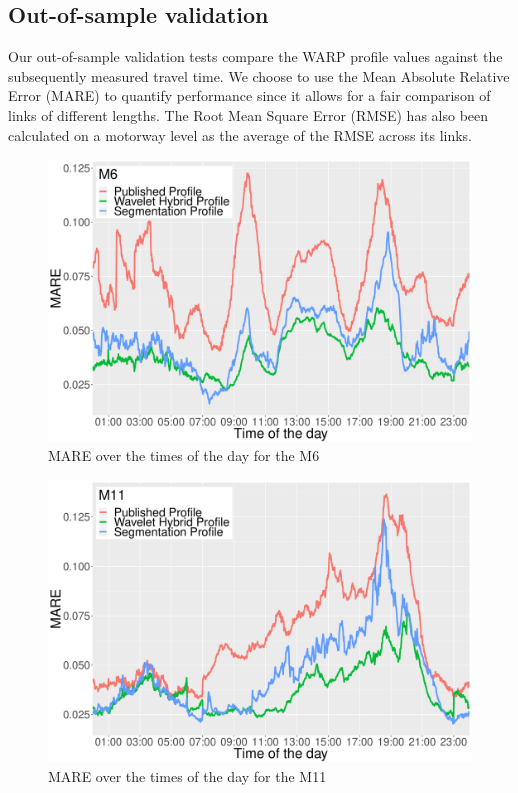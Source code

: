 \documentclass[a4paper, 10pt, conference]{ieeeconf}      %
\begin{document}
\subsection{Out-of-sample validation}
Our out-of-sample validation tests compare the WARP profile values against the subsequently measured travel time. 
We choose to use the Mean Absolute Relative Error (MARE) to quantify performance since it allows for a fair comparison of links of different lengths.
The Root Mean Square Error (RMSE) has also been calculated on a motorway level as the average of the RMSE across its links.
\begin{figure}[htbp]
	\centerline{\includegraphics[width=\linewidth]{./images/M6_daytime_8_12.pdf}}
	\caption{MARE over the times of the day for the M6}
	\label{fig:m6dt}
\end{figure}
\begin{figure}[htbp]
	\centerline{\includegraphics[width=\linewidth]{./images/M11_daytime_8_12.pdf}}
	\caption{MARE over the times of the day for the M11}
	\label{fig:m11dt}
\end{figure}
\end{document}
